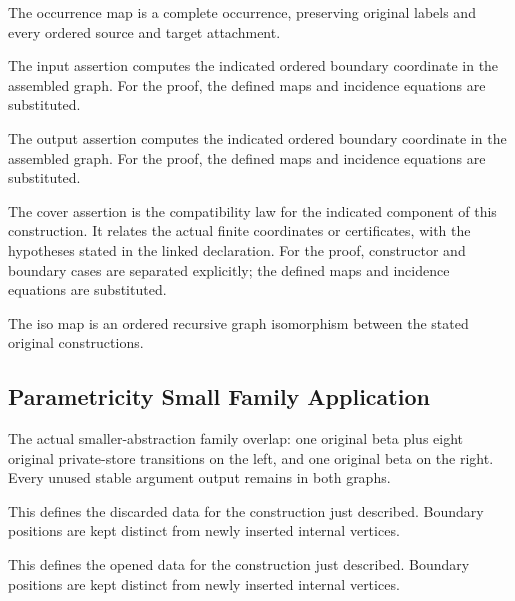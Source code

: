 The occurrence map is a complete occurrence, preserving original labels and every ordered source and target attachment.
\par{}

The input assertion computes the indicated ordered boundary coordinate in the assembled graph.
For the proof, the defined maps and incidence equations are substituted.
\par{}

The output assertion computes the indicated ordered boundary coordinate in the assembled graph.
For the proof, the defined maps and incidence equations are substituted.
\par{}

The cover assertion is the compatibility law for the indicated component of this construction. It relates the actual finite coordinates or certificates, with the hypotheses stated in the linked declaration.
For the proof, constructor and boundary cases are separated explicitly; the defined maps and incidence equations are substituted.
\par{}

The iso map is an ordered recursive graph isomorphism between the stated original constructions.
\par{}

\subsection{Parametricity Small Family Application}
The actual smaller-abstraction family overlap: one original beta plus eight original private-store transitions on the left, and one original beta on the right. Every unused stable argument output remains in both graphs.

This defines the discarded data for the construction just described. Boundary positions are kept distinct from newly inserted internal vertices.
\par{}

This defines the opened data for the construction just described. Boundary positions are kept distinct from newly inserted internal vertices.
\par{}

